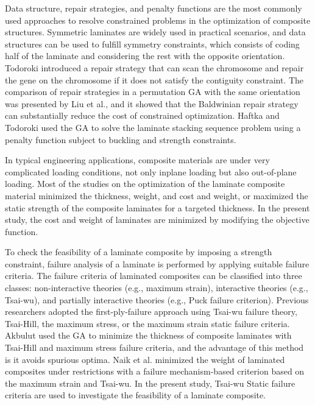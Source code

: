 Data structure, repair strategies, and penalty functions\cite{le1995improved} are the most commonly used
approaches to resolve constrained problems in the optimization of composite structures. Symmetric
laminates are widely used in practical scenarios, and data structures can be used to fulfill symmetry
constraints, which consists of coding half of the laminate and considering the rest with the
opposite orientation. Todoroki\cite{todoroki1998stacking} introduced a repair strategy that can scan the chromosome and
repair the gene on the chromosome if it does not satisfy the contiguity constraint. The comparison of
repair strategies in a permutation GA with the same orientation was presented by Liu et al.\cite{liu2000permutation}, and it
showed that the Baldwinian repair strategy can substantially reduce the cost of constrained optimization.
Haftka and Todoroki\cite{riche1993optimization} used the GA to solve the laminate stacking sequence problem using a penalty function subject to
buckling and strength constraints.

In typical engineering applications, composite materials are under very complicated loading
conditions, not only inplane loading but also out-of-plane loading. Most of the studies on the
optimization of the laminate composite material minimized the
thickness\cite{abu1998optimum,walker2003technique},
weight\cite{fang1993design,deka2005multiobjective,park2008improved}, and cost and
weight\cite{deka2005multiobjective,omkar2008artificial}, or maximized the static strength of
the composite laminates for a targeted
thickness\cite{walker2003technique,lin2004stacking,kim2007development,gholami2020multi}. 
In the present study,
the cost and weight of laminates are minimized by modifying the objective function.

To check the feasibility of a laminate composite by imposing a strength constraint, failure
analysis of a laminate is performed by applying suitable failure criteria. The failure criteria of
laminated composites can be classified into three classes: non-interactive theories (e.g., maximum
strain), interactive theories (e.g., Tsai-wu), and partially interactive theories (e.g., Puck failure
criterion). Previous researchers adopted the first-ply-failure approach using Tsai-wu
failure
theory\cite{massard1984computer,reddy1987first,fang1993design,soeiro1994multilevel,pelletier2006multi,jadhav2007parametric,omkar2008artificial,choudhury2019failure},
Tsai-Hill\cite{martin1987optimum,soares1995discrete}, the maximum stress\cite{watkins1987multicriteria}, or the maximum strain\cite{watkins1987multicriteria}
static failure criteria. Akbulut\cite{akbulut2008optimum} used the GA to minimize the thickness of composite laminates with
Tsai-Hill and maximum stress failure criteria, and the advantage of this method is it avoids spurious
optima. Naik et al.\cite{naik2008design}
minimized the weight of laminated composites under restrictions with a
failure mechanism-based criterion based on the maximum strain and Tsai-wu. In the present study, Tsai-wu
Static failure criteria are used to investigate the feasibility of a laminate composite.

